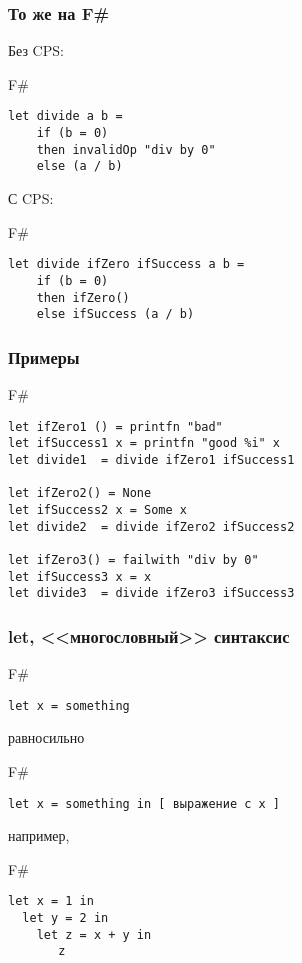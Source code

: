 \documentclass[xetex,mathserif,serif]{beamer}
\begin{document}
	\begin{frame}[fragile]
		\frametitle{То же на F\#}
		Без CPS:
		\begin{exampleblock}{F\#}
			\begin{verbatim}
let divide a b =
    if (b = 0) 
    then invalidOp "div by 0"
    else (a / b)
			\end{verbatim}
		\end{exampleblock}
		С CPS:
		\begin{exampleblock}{F\#}
			\begin{verbatim}
let divide ifZero ifSuccess a b = 
    if (b = 0) 
    then ifZero()
    else ifSuccess (a / b)
			\end{verbatim}
		\end{exampleblock}
\end{frame}

	\begin{frame}[fragile]
		\frametitle{Примеры}
		\begin{exampleblock}{F\#}
			\begin{verbatim}
let ifZero1 () = printfn "bad"
let ifSuccess1 x = printfn "good %i" x
let divide1  = divide ifZero1 ifSuccess1

let ifZero2() = None
let ifSuccess2 x = Some x
let divide2  = divide ifZero2 ifSuccess2

let ifZero3() = failwith "div by 0"
let ifSuccess3 x = x
let divide3  = divide ifZero3 ifSuccess3
			\end{verbatim}
		\end{exampleblock}
\end{frame}

	\begin{frame}[fragile]
		\frametitle{let, <<многословный>> синтаксис}
		\begin{exampleblock}{F\#}
			\begin{verbatim}
let x = something
			\end{verbatim}
		\end{exampleblock}
		равносильно
		\begin{exampleblock}{F\#}
			\begin{verbatim}
let x = something in [ выражение c x ]
			\end{verbatim}
		\end{exampleblock}
		например,
		\begin{exampleblock}{F\#}
			\begin{verbatim}
let x = 1 in   
  let y = 2 in 
    let z = x + y in
       z
			\end{verbatim}
		\end{exampleblock}
\end{frame}
\end{document}
